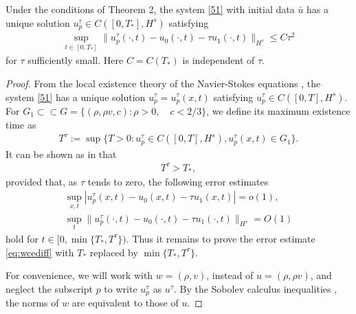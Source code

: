 \documentclass{article}
\theoremstyle{plain}
\begin{document}
\addtocounter{thm}{-1}
\renewcommand{\thethm}{\arabic{thm}$'$}
\begin{thm}
  Under the conditions of Theorem 2, %
the system \eqref{51} with initial data $\bar{u} $ has a unique solution $u_p^\tau \in C([0,T_*],H^s)$ satisfying
\begin{eqnarray}\label{eq:wcediff}
  \sup_{t \in [0,T_*]} \| u^\tau_p(\cdot,t) - u_0 (\cdot, t) - \tau u_1(\cdot, t)\|_{H^s} \le C \tau^2
\end{eqnarray}
for $\tau$ sufficiently small. Here $C=C(T_*)$ is independent of $\tau$.
\end{thm}

\begin{proof}
From the local existence theory of the Navier-Stokes equations \cite{kawashima1984phd}, the system \eqref{51} has a unique solution $u^\tau_p=u^\tau_p(x,t)$ satisfying $u^\tau_p \in C([0,T],H^s)$. For $G_1\subset\subset G= \{(\rho, \rho v, c): \rho>0, \quad c< 2/3\}$, we define its maximum existence time as
\begin{eqnarray*}
  T^\tau :=\sup \{T>0 : u_p^\tau  \in C([0,T],H^s), u^\tau_p(x,t) \in G_1 \}.
\end{eqnarray*}
It can be shown as in \cite{yong2001basic} that
\begin{eqnarray*}
T^\tau > T_*,
\end{eqnarray*}
provided that, as $\tau$ tends to zero, the following error estimates
\begin{eqnarray*}
\sup_{x,t} |u_p^\tau(x,t) - u_0 (x, t) - \tau u_1(x,t)|=o(1), \\
\sup_t \| u_p^\tau(\cdot ,t) - u_0 (\cdot, t) - \tau u_1(\cdot, t) \|_{H^s} = O(1)
\end{eqnarray*}
hold for $t \in [0,\min\{T_*,T^\tau\})$. Thus it remains to prove the error estimate \eqref{eq:wcediff} with $T_*$ replaced by $\min\{T_*,T^\tau\}$.

For convenience, we will work with $w=(\rho,v)$, instead of $u=(\rho,\rho v)$, and  neglect the subscript $p$ to write $u^\tau_p$ as $u^\tau$. By the Sobolev calculus inequalities \cite{majda1984compressible}, the norms of $w$ are equivalent to those of $u$.


\end{proof}
\end{document}
